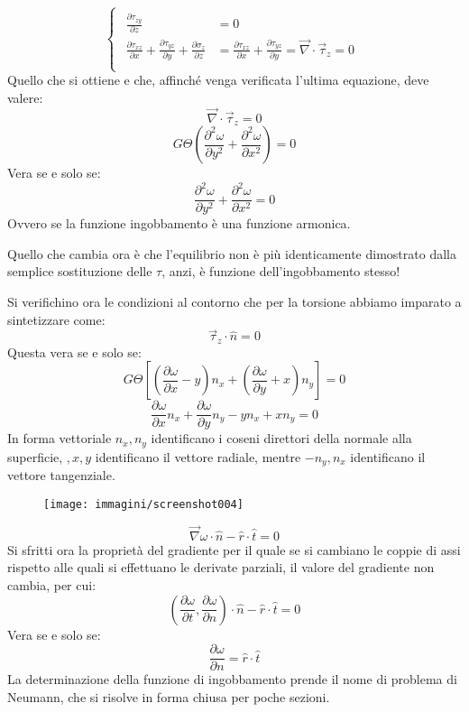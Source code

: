 \documentclass{article}
\begin{document}
\begin{adjustwidth}{2in}{}
\[\begin{cases}
\begin{aligned}
				\frac{\partial \tau_{zy}}{\partial z} & =0 \\
				
				\frac{\partial \tau_{xz}}{\partial x} + \frac{\partial \tau_{yz}}{\partial y} + \frac{\partial\sigma_z}{\partial z} & = \frac{\partial \tau_{xz}}{\partial x} + \frac{\partial \tau_{yz}}{\partial y} = \vec{\nabla}\cdot\vec{\tau}_z = 0 \\
			\end{aligned}
		\end{cases}
		\]
		Quello che si ottiene e che, affinché venga verificata l'ultima equazione, deve valere:
		\[ \vec{\nabla}\cdot\vec{\tau}_z = 0 \]
		\[G\Theta\left(\dfrac{\partial^2 \omega}{\partial y^2} + \dfrac{\partial^2 \omega}{\partial x^2} \right)= 0\]
		Vera se e solo se:
		\[ \boxed{\dfrac{\partial^2 \omega}{\partial y^2} + \dfrac{\partial^2 \omega}{\partial x^2} = 0} \]
		Ovvero se la funzione ingobbamento è una funzione armonica. \newline 
		
		Quello che cambia ora è che l'equilibrio non è più identicamente dimostrato dalla semplice sostituzione delle $\tau$, anzi, è funzione dell'ingobbamento stesso! \newline 
		
		Si verifichino ora le condizioni al contorno che per la torsione abbiamo imparato a sintetizzare come: 
		\[\vec{\tau}_z \cdot \hat{n} = 0\]
		Questa vera se e solo se: 
		\[ G\Theta \left[\left(\dfrac{\partial \omega}{\partial x} - y\right)n_x + \left(\dfrac{\partial \omega}{\partial y} +x\right)n_y\right] = 0\]
		\[ \dfrac{\partial \omega}{\partial x}n_x + \dfrac{\partial \omega}{\partial y}n_y - yn_x  + xn_y = 0\]
		In forma vettoriale $n_x, n_y$ identificano i coseni direttori della normale alla superficie, $,x,y$ identificano il vettore radiale, mentre $ -n_y, n_x$ identificano il vettore tangenziale.
		
\begin{figure}[H]
	\centering
	\texttt{[image: immagini/screenshot004]}
	\label{fig:screenshot004}
\end{figure}
		
		\[ \vec{\nabla}\omega \cdot \hat{n} - \hat{r} \cdot \hat{t} = 0\]
		Si sfritti ora la proprietà del gradiente per il quale se si cambiano le coppie di assi rispetto alle quali si effettuano le derivate parziali, il valore del gradiente non cambia, per cui:
		\[ \left(\dfrac{\partial \omega}{\partial t}, \dfrac{\partial \omega}{\partial n} \right)\cdot \hat{n} - \hat{r} \cdot \hat{t} = 0\]
		Vera se e solo se: 
		\[ \boxed{\dfrac{\partial \omega}{\partial n} = \hat{r} \cdot \hat{t}}\]
		La determinazione della funzione di
		ingobbamento prende il nome di problema di Neumann, che si risolve in forma chiusa per poche sezioni. \newline 
		

\end{adjustwidth}
\end{document}
